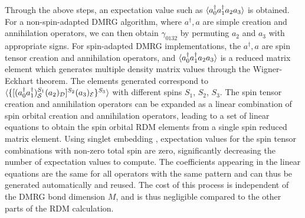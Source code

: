 Through the above steps, an expectation value such as $\braket{{a}^\dagger_0{a}^\dagger_1{a}_2{a}_3}$ is obtained. 
For a non-spin-adapted DMRG algorithm, where $a^\dag, a$ are simple creation and annihilation operators, 
we can then obtain $\gamma_{0132}$ by permuting $ {a}_2$ and ${a}_3$ with appropriate signs. For spin-adapted DMRG implementations, the $a^\dag, a$ 
are spin tensor creation and annihilation operators, and
$\braket{{a}^\dagger_0{a}^\dagger_1{a}_2{a}_3}$ is a reduced matrix element which generates multiple density matrix 
values through the Wigner-Eckhart theorem.
 The elements generated correspond to $\braket{\{[({a}^\dagger_0{a}^\dagger_1)^{S_1}_{\mathcal{S}}({a}_2)_{\mathcal{D}}]^{S_2}({a}_3)_{\mathcal{E}}\}^{S_3}}$ with different spins $S_1$, $S_2$, $S_3$. The spin tensor creation and annihilation operators can be expanded as a linear combination of spin orbital creation
and annihilation operators, leading to a set of linear equations to obtain the spin orbital RDM elements from a single spin reduced matrix element. Using singlet embedding \cite{tatsuaki_interaction-round--face_2000, sharma_spin-adapted_2012}, expectation values for the spin tensor combinations with non-zero total spin are zero, significantly decreasing the number of 
expectation values to compute. The coefficients appearing in the linear equations are the same for all operators with the same pattern and can thus be generated 
automatically and reused. The cost of this process is independent of the DMRG bond dimension $M$, and is thus negligible compared to the other parts of the RDM calculation.

